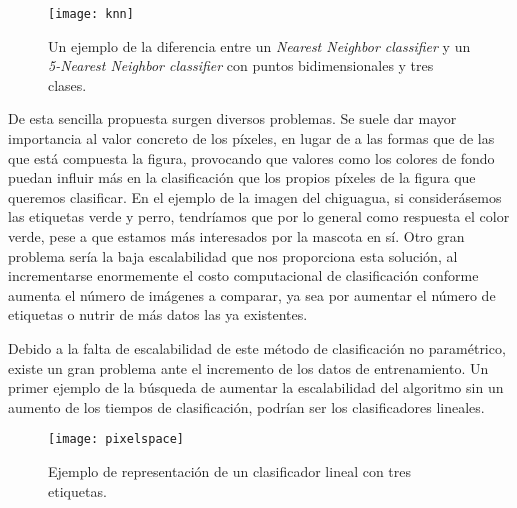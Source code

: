 \begin{figure}[htpb]
  \centering
  \texttt{[image: knn]}
  \caption{Un ejemplo de la diferencia entre un \emph{Nearest Neighbor classifier} y un \emph{5-Nearest Neighbor classifier} con puntos bidimensionales y tres clases.\cite{stanford}}
  \label{fig:knn}
\end{figure}

De esta sencilla propuesta surgen diversos problemas. Se suele dar mayor importancia al valor concreto de los píxeles, en lugar de a las formas que de las que está compuesta la figura, provocando que valores como los colores de fondo puedan influir más en la clasificación que los propios píxeles de la figura que queremos clasificar. En el ejemplo de la imagen del chiguagua, si considerásemos las etiquetas verde y perro, tendríamos que por lo general como respuesta el color verde, pese a que estamos más interesados por la mascota en sí. Otro gran problema sería la baja escalabilidad que nos proporciona esta solución, al incrementarse enormemente el costo computacional de clasificación conforme aumenta el número de imágenes a comparar, ya sea por aumentar el número de etiquetas o nutrir de más datos las ya existentes.\newline


Debido a la falta de escalabilidad de este método de clasificación no paramétrico, existe un gran problema ante el incremento de los datos de entrenamiento. Un primer ejemplo de la búsqueda de aumentar la escalabilidad del algoritmo sin un aumento de los tiempos de clasificación, podrían ser los clasificadores lineales.\\

\begin{figure}[htpb]
  \centering
  \texttt{[image: pixelspace]}
  \caption{Ejemplo de representación de un clasificador lineal con tres etiquetas.\cite{stanford}}
  \label{fig:pixelspace}
\end{figure}

